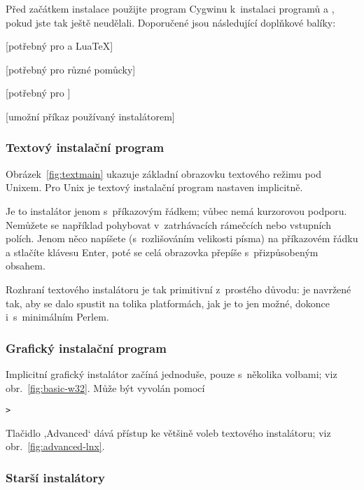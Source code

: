 \documentclass[\classoptions,slovak,english,czech]{\classname}
\newcommand{\singleuv}[1]{,#1`}
\begin{document}
Před začátkem instalace použijte program Cygwinu 
 k~instalaci programů 
 a , pokud jste tak ještě neudělali.
Doporučené jsou následující doplňkové balíky:
\begin{itemize*}
\item {} [potřebný pro \XeTeX a Lua\TeX]
\item {} [potřebný pro různé pomůcky]
\item {} [potřebný pro ]
\item {} [umožní příkaz 
       používaný instalátorem]
\end{itemize*}

\subsubsection{Textový instalační program}

Obrázek~\ref{fig:textmain} ukazuje základní obrazovku textového režimu pod Unixem.
Pro Unix je textový instalační program nastaven implicitně.

Je to instalátor jenom s~příkazovým řádkem; vůbec nemá kurzorovou podporu.
Nemůžete se například pohybovat v~zatrhávacích rámečcích nebo vstupních polích. 
Jenom něco napíšete (s~rozlišováním velikosti písma) na příkazovém řádku a 
stlačíte klávesu Enter, poté se celá obrazovka přepíše s~přizpůsobeným obsahem.

Rozhraní textového instalátoru je tak primitivní z~prostého důvodu: je
navržené tak, aby se dalo spustit na tolika platformách, jak je to jen
možné, dokonce i~s~minimálním Perlem.

\subsubsection{Grafický instalační program}
\label{sec:graphical-inst}

Implicitní grafický instalátor začíná jednoduše, pouze s~několika
volbami; viz obr.~\ref{fig:basic-w32}.
Může být vyvolán pomocí
\begin{alltt}
	> 
\end{alltt}
Tlačidlo \singleuv{Advanced} dává přístup ke většině voleb textového
instalátoru; viz obr.~\ref{fig:advanced-lnx}.

\subsubsection{Starší instalátory}
\end{document}
